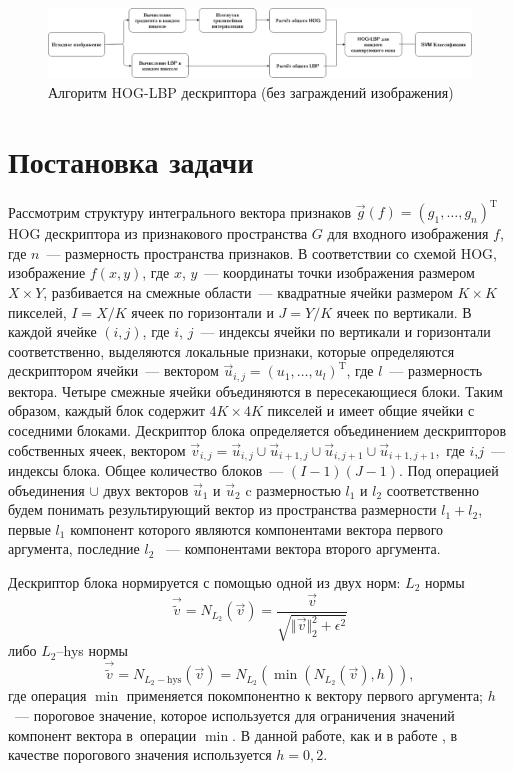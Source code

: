 \documentclass[12pt,twoside]{article}
\begin{document}
\begin{figure}[H]
	\includegraphics[width=1\textwidth]{Graph}
	\caption{Алгоритм HOG-LBP дескриптора (без заграждений изображения) }
	\label{fg:Wang1}
\end{figure}

\section{Постановка задачи}
Рассмотрим структуру интегрального вектора признаков $\vec{g}(f) = (g_{1},\dots , g_{n})^{\mathrm{T}}$ HOG дескриптора \cite{dalaltriggs2005} из признакового пространства $G$ для входного изображения $f$, где $n$~--- размерность пространства признаков. В соответствии со схемой
HOG, изображение $f(x,y)$, где $x$, $y$~--– координаты точки изображения размером $X\times Y$, разбивается на смежные области~--– квадратные ячейки размером $K\times K$ пикселей, $I=X/K$ ячеек по горизонтали и $J=Y/K$ ячеек по вертикали. 
В каждой ячейке $(i,j)$, где $i$, $j$~--- индексы ячейки по вертикали 	и горизонтали соответственно, выделяются локальные признаки, которые определяются дескриптором ячейки~--- вектором $\vec{u}_{i,j} = (u_1, \dots , u_l)^{\mathrm{T}}$, где $l$~---	размерность вектора. Четыре смежные ячейки объединяются в пересекающиеся блоки. Таким образом, каждый блок содержит $4K \times 4K$ пикселей и имеет общие ячейки с соседними блоками. Дескриптор блока определяется объединением дескрипторов собственных ячеек, вектором $\vec{v}_{i,j} = \vec{u}_{i,j}\cup\vec{u}_{i+1,j}\cup\vec{u}_{i,j+1}
	\cup\vec{u}_{i+1,j+1},$ где $i$,$j$~--- индексы блока.
	Общее количество блоков~--- $(I-1)(J-1)$. Под операцией
	объединения $\cup$ двух векторов $\vec{u}_{1}$ и $\vec{u}_{2}$
	c размерностью $l_{1}$ и $l_{2}$ соответственно будем понимать результирующий вектор из пространства размерности $l_{1}+l_{2}$, первые $l_{1}$ компонент которого являются компонентами вектора первого аргумента, последние $l_{2}$ ~--- компонентами вектора второго аргумента.
	
	 Дескриптор блока нормируется с помощью одной из двух норм:
		 $L_2$ нормы
\begin{equation*}
	\vec{\tilde{v}} = N_{L_{2}}(\vec{v}) =  \frac{\vec{v}}{\sqrt{\Vert \vec{v} \Vert_{2}^{2} + \epsilon^{2}}}
	\label{eq:L2}
\end{equation*}
либо $L_2$--hys нормы \cite{dalaltriggs2005}
\begin{equation*}
	\vec{\tilde{v}} = N_{L_{2}-\mathrm{hys}}(\vec{v}) =  N_{L_{2}}
	\left(\min(N_{L_{2}}(\vec{v}),h)\right),
	\label{eq:L2-hys}
\end{equation*}
где операция $\min$ применяется покомпонентно к вектору первого
аргумента; $h$~--- пороговое значение, которое используется для
ограничения значений компонент вектора в~операции $\min$. В данной работе, как и в работе \cite{dalaltriggs2005}, в качестве порогового значения используется $h=0{,}2$.
\end{document}
